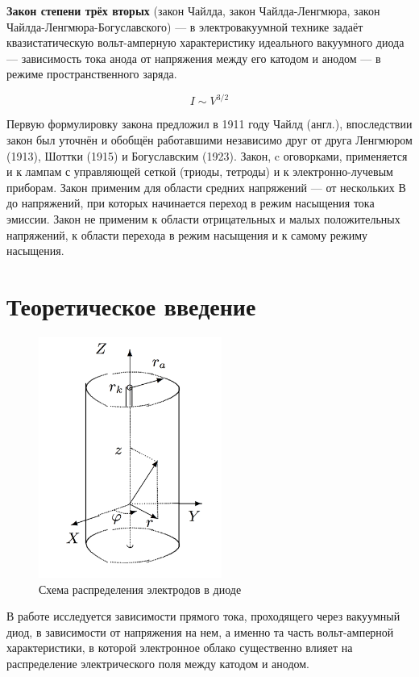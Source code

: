 \documentclass[12pt]{kiarticle}
\begin{document}
\textbf{Закон степени трёх вторых} (закон Чайлда, закон Чайлда-Ленгмюра, закон Чайлда-Ленгмюра-Богуславского) ---  в электровакуумной технике задаёт квазистатическую вольт-амперную характеристику идеального вакуумного диода --- зависимость тока анода от напряжения между его катодом и анодом --- в режиме пространственного заряда.

\begin{equation}\label{}
I \sim V^{3/2}
\end{equation}

Первую формулировку закона предложил в 1911 году Чайлд (англ.), впоследствии закон был уточнён и обобщён работавшими независимо друг от друга Ленгмюром (1913), Шоттки (1915) и Богуславским (1923). Закон, c оговорками, применяется и к лампам с управляющей сеткой (триоды, тетроды) и к электронно-лучевым приборам. Закон применим для области средних напряжений — от нескольких В до напряжений, при которых начинается переход в режим насыщения тока эмиссии. Закон не применим к области отрицательных и малых положительных напряжений, к области перехода в режим насыщения и к самому режиму насыщения.

\section{Теоретическое введение}
\begin{figure} 
	\includegraphics[width=6cm]{diod}
	\caption{Схема распределения электродов в диоде}
\end{figure}

В работе исследуется зависимости прямого тока, проходящего через вакуумный диод, в зависимости от напряжения на нем, а именно та часть вольт-амперной характеристики, в которой электронное облако существенно влияет на распределение электрического поля между катодом и анодом.
\end{document}
